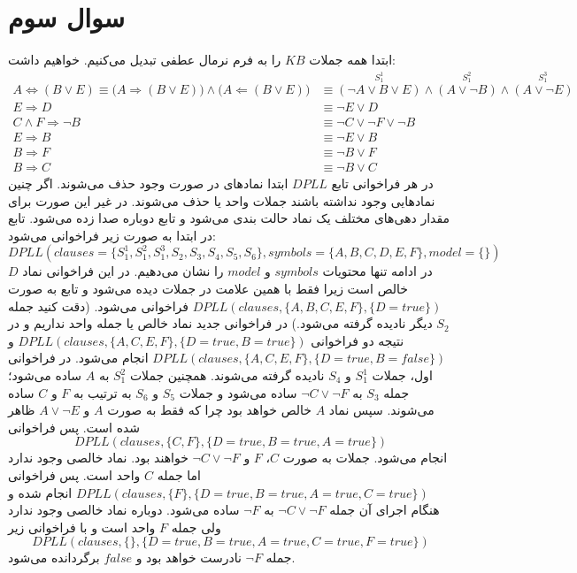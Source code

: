 \documentclass{article}
\begin{document}
\section*{
	سوال سوم
}
ابتدا همه جملات $KB$ را به فرم نرمال عطفی تبدیل می‌کنیم. خواهیم داشت:
\begin{align}
	A \iff (B \vee E) \equiv \Big(A \Longrightarrow (B \vee E)\Big) \wedge \Big(A \Longleftarrow (B \vee E)\Big) &\equiv \stackrel{S_{1}^{1}}{(\neg A \vee B \vee E)} \wedge \stackrel{S_{1}^{2}}{(A \vee \neg B)} \wedge \stackrel{S_{1}^{3}}{(A \vee \neg E)} \tag{$S_1$} \\
	E \Longrightarrow D &\equiv \neg E \vee D \tag{$S_2$} \\
	C \wedge F \Longrightarrow \neg B &\equiv \neg C \vee \neg F \vee \neg B \tag{$S_3$} \\
	E \Longrightarrow B &\equiv \neg E \vee B \tag{$S_4$} \\
	B \Longrightarrow F &\equiv \neg B \vee F \tag{$S_5$} \\
	B \Longrightarrow C &\equiv \neg B \vee C \tag{$S_6$}
\end{align}
در هر فراخوانی تابع $DPLL$ ابتدا نماد‌های  در صورت وجود حذف می‌شوند. اگر چنین نماد‌هایی وجود نداشته باشند جملات واحد یا  حذف می‌شوند. در غیر این صورت برای مقدار دهی‌های مختلف یک نماد حالت بندی می‌شود و تابع دوباره صدا زده می‌شود. تابع در ابتدا به صورت زیر فراخوانی می‌شود:
$$DPLL(clauses = \{S_{1}^{1}, S_{1}^{2}, S_{1}^{3}, S_2, S_3, S_4, S_5, S_6\}, symbols = \{A, B, C, D, E, F\}, model=\{\})$$
در ادامه تنها محتویات $symbols$ و $model$ را نشان می‌دهیم. در این فراخوانی نماد‌ $D$ خالص است زیرا فقط با همین علامت در جملات دیده می‌شود و تابع به صورت 
$DPLL(clauses, \{A, B, C, E, F\}, \{D = true\})$
فراخوانی می‌شود. (دقت کنید جمله $S_2$ دیگر نادیده گرفته می‌شود.) در فراخوانی جدید نماد خالص یا جمله واحد نداریم و در نتیجه دو فراخوانی
$DPLL(clauses, \{A, C, E, F\}, \{D = true, B = true\})$
و
$DPLL(clauses, \{A, C, E, F\}, \{D = true, B = false\})$
انجام می‌شود. در فراخوانی اول، جملات $S_{1}^{1}$ و $S_4$ نادیده گرفته می‌شوند. همچنین جملات 
$S_{1}^{2}$
به $A$ ساده می‌شود؛ جمله 
$S_3$
به 
$\neg C \vee \neg F$
ساده می‌شود و جملات $S_5$ و $S_6$ به ترتیب به $F$ و $C$ ساده می‌شوند. سپس نماد $A$ خالص خواهد بود چرا که فقط به صورت $A$ و $A \vee \neg E$ ظاهر شده است. پس فراخوانی 
$$DPLL(clauses, \{C, F\}, \{D = true, B = true, A = true\})$$
انجام می‌شود. جملات به صورت $C$، $F$ و $\neg C \vee \neg F$ خواهند بود. نماد خالصی وجود ندارد اما جمله $C$ واحد است. پس فراخوانی 
$DPLL(clauses, \{F\}, \{D = true, B = true, A = true, C = true\})$
انجام شده و هنگام اجرای آن جمله 
$\neg C \vee \neg F$
به $\neg F$ ساده می‌شود. دوباره نماد خالصی وجود ندارد ولی جمله $F$ واحد است و با فراخوانی زیر 
$$DPLL(clauses, \{\}, \{D = true, B = true, A = true, C = true, F = true\})$$
جمله 
$\neg F$ 
نادرست خواهد بود و $false$ برگردانده می‌شود.
\end{document}
